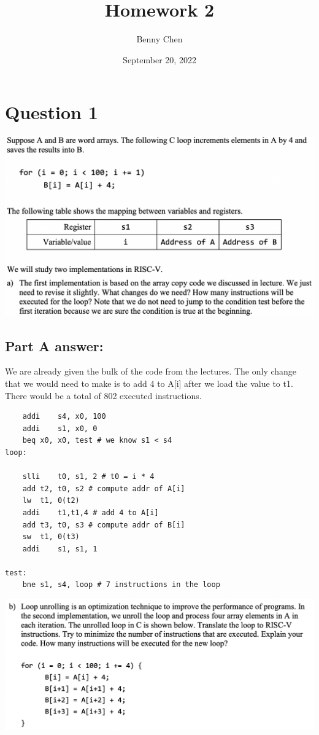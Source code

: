 \documentclass{article}
\title{Homework 2}
\author{Benny Chen}
\date{September 20, 2022}
\begin{document}
\maketitle

\section*{Question 1}

\begin{center}
    \includegraphics[scale=.56]{./images/q1parta.png}
\end{center}
\subsection*{Part A answer:}

We are already given the bulk of the code from the lectures.
The only change that we would need to make is to add 4 to A[i]
after we load the value to t1. There would be a total of 802 
executed instructions.

\begin{lstlisting}
	addi	s4, x0, 100
	addi	s1, x0, 0
	beq	x0, x0, test # we know s1 < s4
loop:	

	slli	t0, s1, 2 # t0 = i * 4
	add	t2, t0, s2 # compute addr of A[i]
	lw	t1, 0(t2)
	addi	t1,t1,4 # add 4 to A[i]
	add	t3, t0, s3 # compute addr of B[i]
	sw	t1, 0(t3)
	addi	s1, s1, 1

test: 	
	bne	s1, s4, loop # 7 instructions in the loop
\end{lstlisting}

\begin{center}
    \includegraphics[scale=.557]{./images/q1partb.png}
\end{center}
\end{document}
